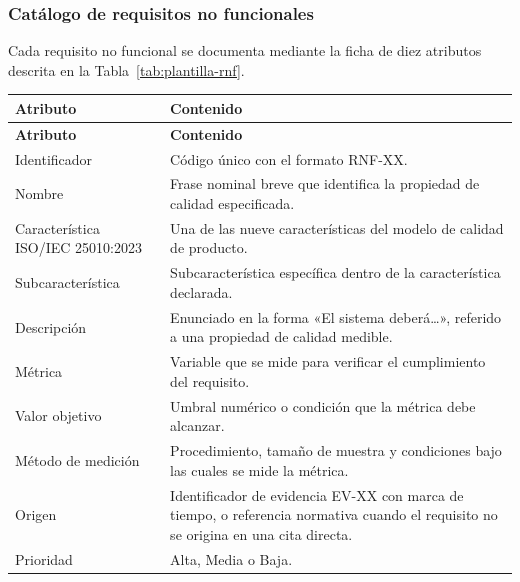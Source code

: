 \documentclass[12pt,a4paper]{article}
\begin{document}
\subsubsection{Catálogo de requisitos no funcionales}
\label{sec:catalogo-rnf}

Cada requisito no funcional se documenta mediante la ficha de diez atributos descrita en la Tabla~\ref{tab:plantilla-rnf}.

\begin{center}
\begin{longtable}{|p{3.8cm}|p{10.4cm}|}
\hline
\textbf{Atributo} & \textbf{Contenido} \\
\hline
\endfirsthead
\hline
\textbf{Atributo} & \textbf{Contenido} \\
\hline
\endhead
\hline
\endfoot
\hline
\endlastfoot
Identificador & Código único con el formato RNF-XX. \\
\hline
Nombre & Frase nominal breve que identifica la propiedad de calidad especificada. \\
\hline
Característica ISO/IEC 25010:2023 & Una de las nueve características del modelo de calidad de producto. \\
\hline
Subcaracterística & Subcaracterística específica dentro de la característica declarada. \\
\hline
Descripción & Enunciado en la forma «El sistema deberá\ldots», referido a una propiedad de calidad medible. \\
\hline
Métrica & Variable que se mide para verificar el cumplimiento del requisito. \\
\hline
Valor objetivo & Umbral numérico o condición que la métrica debe alcanzar. \\
\hline
Método de medición & Procedimiento, tamaño de muestra y condiciones bajo las cuales se mide la métrica. \\
\hline
Origen & Identificador de evidencia EV-XX con marca de tiempo, o referencia normativa cuando el requisito no se origina en una cita directa. \\
\hline
Prioridad & Alta, Media o Baja. \\
\hline
\end{longtable}
\label{tab:plantilla-rnf}
\end{center}
\end{document}

